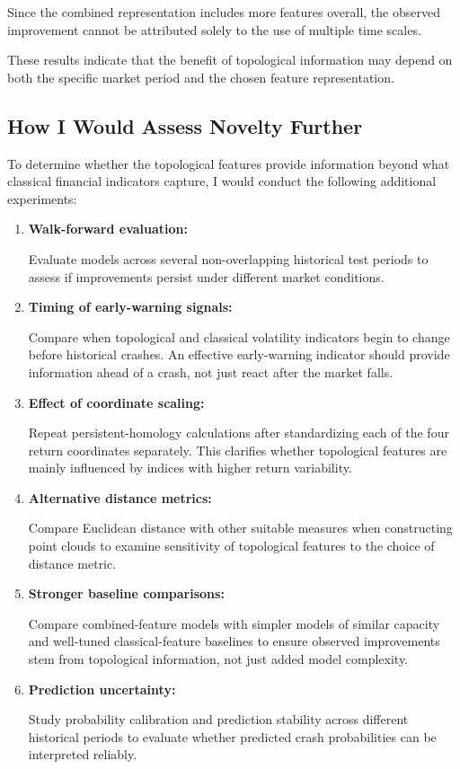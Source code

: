 \documentclass[oneside,english,11pt]{article}
\begin{document}
Since the combined representation includes more features overall, the observed improvement cannot be attributed solely to the use of multiple time scales. 

These results indicate that the benefit of topological information may depend on both the specific market period and the chosen feature representation.


\subsection{How I Would Assess Novelty Further}

To determine whether the topological features provide information beyond what classical financial indicators capture, I would conduct the following additional experiments:

\begin{enumerate}[leftmargin=*]

\item \textbf{Walk-forward evaluation:}

Evaluate models across several non-overlapping historical test periods to assess if improvements persist under different market conditions.

\item \textbf{Timing of early-warning signals:}

Compare when topological and classical volatility indicators begin to change before historical crashes. An effective early-warning indicator should provide information ahead of a crash, not just react after the market falls.

\item \textbf{Effect of coordinate scaling:}

Repeat persistent-homology calculations after standardizing each of the four return coordinates separately. This clarifies whether topological features are mainly influenced by indices with higher return variability.

\item \textbf{Alternative distance metrics:}

Compare Euclidean distance with other suitable measures when constructing point clouds to examine sensitivity of topological features to the choice of distance metric.

\item \textbf{Stronger baseline comparisons:}

Compare combined-feature models with simpler models of similar capacity and well-tuned classical-feature baselines to ensure observed improvements stem from topological information, not just added model complexity.

\item \textbf{Prediction uncertainty:}

Study probability calibration and prediction stability across different historical periods to evaluate whether predicted crash probabilities can be interpreted reliably.

\end{enumerate}
\end{document}
